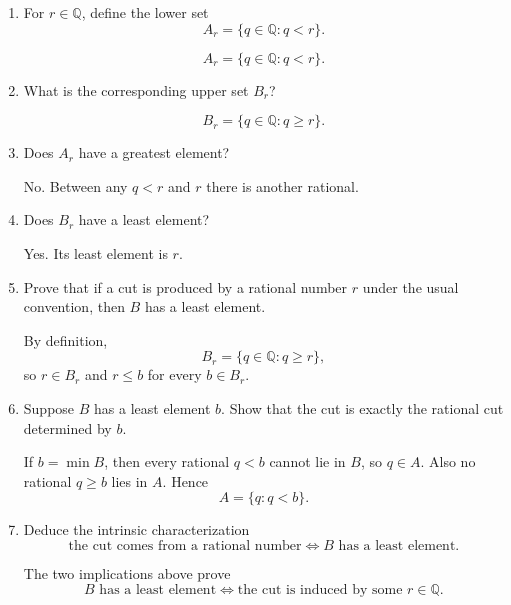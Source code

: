 \documentclass{self-check}
\begin{document}
\begin{enumerate}[label=\arabic*., itemsep=10pt]

\item For $r\in\mathbb{Q}$, define the lower set
\[
A_r=\{q\in\mathbb{Q}:q<r\}.
\]

\begin{answer}
\[
A_r=\{q\in\mathbb{Q}:q<r\}.
\]
\end{answer}

\item What is the corresponding upper set $B_r$?

\begin{answer}
\[
B_r=\{q\in\mathbb{Q}:q\ge r\}.
\]
\end{answer}

\item Does $A_r$ have a greatest element?

\begin{answer}
No. Between any $q<r$ and $r$ there is another rational.
\end{answer}

\item Does $B_r$ have a least element?

\begin{answer}
Yes. Its least element is $r$.
\end{answer}

\item Prove that if a cut is produced by a rational number $r$ under the usual convention, then $B$ has a least element.

\begin{answer}
By definition,
\[
B_r=\{q\in\mathbb{Q}:q\ge r\},
\]
so $r\in B_r$ and $r\le b$ for every $b\in B_r$.
\end{answer}

\item Suppose $B$ has a least element $b$. Show that the cut is exactly the rational cut determined by $b$.

\begin{answer}
If $b=\min B$, then every rational $q<b$ cannot lie in $B$, so $q\in A$. Also no rational $q\ge b$ lies in $A$. Hence
\[
A=\{q:q<b\}.
\]
\end{answer}

\item Deduce the intrinsic characterization
\[
\text{the cut comes from a rational number}
\iff
B\text{ has a least element}.
\]

\begin{answer}
The two implications above prove
\[
B\text{ has a least element}
\iff
\text{the cut is induced by some }r\in\mathbb{Q}.
\]
\end{answer}


\end{enumerate}
\end{document}
